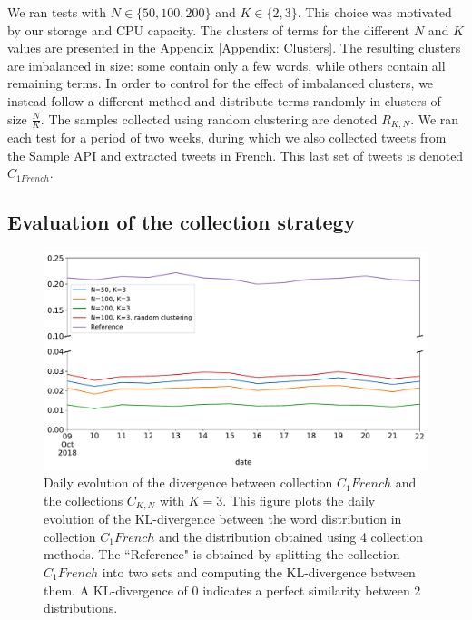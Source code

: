  We ran tests with $N \in \{50, 100, 200\}$ and $K \in \{2,3\}$. This choice was motivated by our storage and CPU capacity. The clusters of terms for the different $N$ and $K$ values are presented in the Appendix \ref{Appendix: Clusters}. The resulting clusters are imbalanced in size: some contain only a few words, while others contain all remaining terms. In order to control for the effect of imbalanced clusters, we instead follow a different method and distribute terms randomly in clusters of size $\frac{N}{K}$. The samples collected using random clustering are denoted $R_{K,N}$. We ran each test for a period of two weeks, during which we also collected tweets from the Sample API and extracted tweets in French. This last set of tweets is denoted $C_{1 French}$.
			
			\subsection{Evaluation of the collection strategy \label{SubSec: evaluation_of_collection}}
			
\begin{figure}
\begin{center}
\includegraphics[scale=.5]{figures/KL_K=3.pdf}
\end{center}
\caption[Daily evolution of the divergence between collection $C_1 French$ and the collections $C_{K,N}$ with $K = 3$.]{Daily evolution of the divergence between collection $C_1 French$ and the collections $C_{K,N}$ with $K = 3$. This figure plots the daily evolution of the KL-divergence between the word distribution in collection $C_1 French$ and the distribution obtained using 4 collection methods. The ``Reference" is obtained by splitting the collection $C_1 French$ into two sets and computing the KL-divergence between them. A KL-divergence of 0 indicates a perfect similarity between 2 distributions.}
\label{Figure:KL_K=3}
\end{figure}

